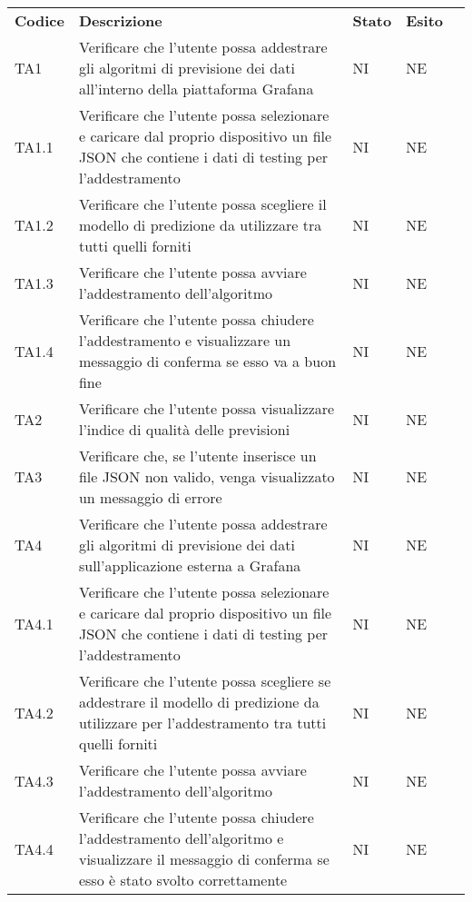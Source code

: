 \setcounter{table}{0}
\begin{longtable} {
		>{}p{15mm} 
		>{}p{79.5mm}
		>{}p{15mm} 
		>{}p{15mm}
		>{}p{0mm}}
	\rowcolor{gray!50}
	\textbf{Codice} & \textbf{Descrizione} & \textbf{Stato} & \textbf{Esito} &\TBstrut \\
	TA1		& Verificare che l'utente possa addestrare gli algoritmi di previsione dei dati all'interno della piattaforma Grafana\glo & NI & NE  &\TBstrut \\ [2mm]
	TA1.1	& Verificare che l'utente possa selezionare e caricare dal proprio dispositivo un file JSON che contiene i dati di testing per l'addestramento& NI & NE  &\TBstrut \\ [2mm]
	TA1.2	& Verificare che l'utente possa scegliere il modello di predizione da utilizzare tra tutti quelli forniti & NI & NE  &\TBstrut \\ [2mm]
	TA1.3	& Verificare che l'utente possa avviare l'addestramento dell'algoritmo & NI & NE  &\TBstrut \\ [2mm]
	TA1.4	& Verificare che l'utente possa chiudere l'addestramento e visualizzare un messaggio di conferma se esso va a buon fine & NI & NE  &\TBstrut \\ [2mm]
	TA2		& Verificare che l'utente possa visualizzare l'indice di qualità delle previsioni & NI & NE  &\TBstrut \\ [2mm]
	TA3		& Verificare che, se l'utente inserisce un file JSON non valido, venga visualizzato un messaggio di errore & NI & NE  &\TBstrut \\ [2mm]
	TA4		& Verificare che l'utente possa addestrare gli algoritmi di previsione dei dati sull'applicazione esterna a Grafana\glo & NI & NE  &\TBstrut \\ [2mm]
	TA4.1	& Verificare che l'utente possa selezionare e caricare dal proprio dispositivo un file JSON che contiene i dati di testing per l'addestramento & NI & NE  &\TBstrut \\ [2mm]
	TA4.2	& Verificare che l'utente possa scegliere se addestrare il modello di predizione da utilizzare per l'addestramento tra tutti quelli forniti & NI & NE  &\TBstrut \\ [2mm]
	TA4.3	& Verificare che l'utente possa avviare l'addestramento dell'algoritmo & NI & NE  &\TBstrut \\ [2mm]
	TA4.4	& Verificare che l'utente possa chiudere l'addestramento dell'algoritmo e visualizzare il messaggio di conferma se esso è stato svolto correttamente & NI & NE  &\TBstrut \\ [2mm]

\end{longtable}
